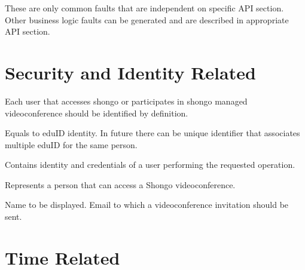 These are only common faults that are independent on specific API section. Other business logic faults can be generated and are described in appropriate API section.


\section{Security and Identity Related}

\begin{Api}

Each user that accesses shongo or participates in shongo managed videoconference should be identified by  definition.

\begin{ApiClassAttributes}
Equals to eduID identity. In future there can be unique identifier that associates multiple eduID for the same person.
\end{ApiClassAttributes}


Contains identity and credentials of a user performing the requested operation.
\begin{ApiClassAttributes}
\item {}
\end{ApiClassAttributes}

Represents a person that can access a Shongo videoconference.
\begin{ApiClassAttributes}
 Name to be displayed.
 Email to which a videoconference invitation should be sent.
\end{ApiClassAttributes}

\end{Api}


\section{Time Related}

